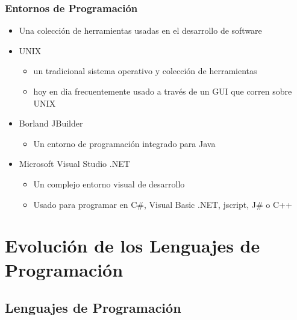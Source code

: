 \documentclass[11pt]{article}
\begin{document}
\subsubsection*{Entornos de Programación}
\label{sec:orgheadline27}
\begin{itemize}
\item Una colección de herramientas usadas en el desarrollo de software
\item UNIX
\begin{itemize}
\item un tradicional sistema operativo y colección de herramientas
\item hoy en dia frecuentemente usado a través de un GUI que corren
sobre UNIX
\end{itemize}
\item Borland JBuilder
\begin{itemize}
\item Un entorno de programación integrado para Java
\end{itemize}
\item Microsoft Visual Studio .NET
\begin{itemize}
\item Un complejo entorno visual de desarrollo
\item Usado para programar en C\#, Visual Basic .NET, jscript, J\# o C++
\end{itemize}
\end{itemize}


\section*{Evolución de los Lenguajes de Programación}
\label{sec:orgheadline103}

\subsection*{Lenguajes de Programación}
\label{sec:orgheadline30}
\end{document}
